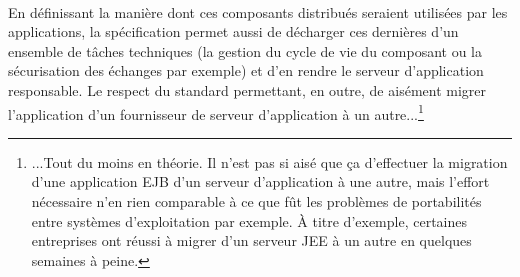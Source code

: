 {   \paragraph{} En définissant la manière dont ces composants distribués seraient utilisées par les
   applications, la spécification permet aussi de décharger ces dernières d'un ensemble de tâches
   techniques (la gestion du cycle de vie du composant ou la sécurisation des échanges par exemple)
   et d'en rendre le serveur d'application responsable. Le respect du standard permettant, en outre,
   de aisément migrer l'application d'un fournisseur de serveur d'application à un
   autre...\footnote{...Tout du moins en théorie. Il n'est pas si aisé que ça d'effectuer la
   migration d'une application EJB d'un serveur d'application à une autre, mais l'effort nécessaire
   n'en rien comparable à ce que fût les problèmes de portabilités entre systèmes d'exploitation par
   exemple. À titre d'exemple, certaines entreprises ont réussi à migrer d'un serveur JEE à un autre
   en quelques semaines à peine.}
}


